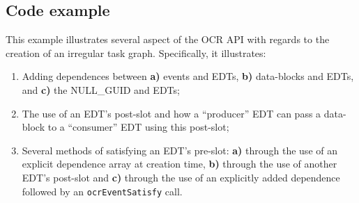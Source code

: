 \subsection{Code example}
This example illustrates several aspect of the OCR API with regards to
the creation of an irregular task graph. Specifically, it illustrates:
\begin{enumerate}
\item{Adding dependences between {\bf a)} events and EDTs, {\bf b)}
    data-blocks and EDTs, and {\bf c)} the NULL\_GUID and EDTs;}
\item{The use of an EDT's post-slot and how a ``producer'' EDT can
    pass a data-block to a ``consumer'' EDT using this post-slot;}
\item{Several methods of satisfying an EDT's pre-slot: {\bf a)}
    through the use of an explicit dependence array at creation time,
    {\bf b)} through the use of another EDT's post-slot and {\bf c)}
    through the use of an explicitly added dependence followed by an
    \texttt{ocrEventSatisfy} call.}
\end{enumerate}
